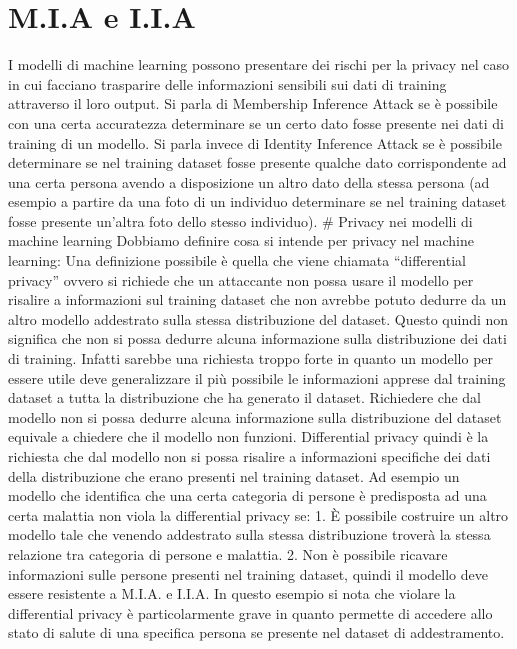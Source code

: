 \section{M.I.A e I.I.A}\label{m.i.a-e-i.i.a}

I modelli di machine learning possono presentare dei rischi per la
privacy nel caso in cui facciano trasparire delle informazioni sensibili
sui dati di training attraverso il loro output. Si parla di Membership
Inference Attack se è possibile con una certa accuratezza determinare se
un certo dato fosse presente nei dati di training di un modello. Si
parla invece di Identity Inference Attack se è possibile determinare se
nel training dataset fosse presente qualche dato corrispondente ad una
certa persona avendo a disposizione un altro dato della stessa persona
(ad esempio a partire da una foto di un individuo determinare se nel
training dataset fosse presente un'altra foto dello stesso individuo).
\# Privacy nei modelli di machine learning Dobbiamo definire cosa si
intende per privacy nel machine learning: Una definizione possibile è
quella che viene chiamata ``differential privacy'' ovvero si richiede
che un attaccante non possa usare il modello per risalire a informazioni
sul training dataset che non avrebbe potuto dedurre da un altro modello
addestrato sulla stessa distribuzione del dataset. Questo quindi non
significa che non si possa dedurre alcuna informazione sulla
distribuzione dei dati di training. Infatti sarebbe una richiesta troppo
forte in quanto un modello per essere utile deve generalizzare il più
possibile le informazioni apprese dal training dataset a tutta la
distribuzione che ha generato il dataset. Richiedere che dal modello non
si possa dedurre alcuna informazione sulla distribuzione del dataset
equivale a chiedere che il modello non funzioni. Differential privacy
quindi è la richiesta che dal modello non si possa risalire a
informazioni specifiche dei dati della distribuzione che erano presenti
nel training dataset. Ad esempio un modello che identifica che una certa
categoria di persone è predisposta ad una certa malattia non viola la
differential privacy se: 1. È possibile costruire un altro modello tale
che venendo addestrato sulla stessa distribuzione troverà la stessa
relazione tra categoria di persone e malattia. 2. Non è possibile
ricavare informazioni sulle persone presenti nel training dataset,
quindi il modello deve essere resistente a M.I.A. e I.I.A. In questo
esempio si nota che violare la differential privacy è particolarmente
grave in quanto permette di accedere allo stato di salute di una
specifica persona se presente nel dataset di addestramento.

